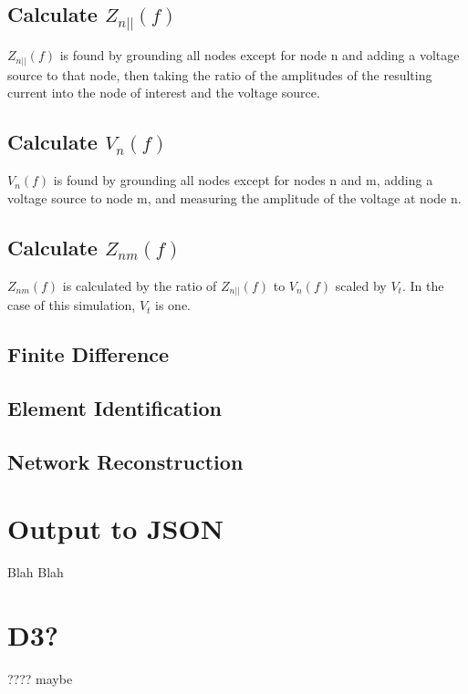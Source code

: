 \subsection{Calculate $Z_{n{||}}(f)$}
$Z_{n{||}}(f)$ is found by grounding all nodes except for node n and adding a voltage source to that node, then taking the ratio of the amplitudes of the resulting current into the node of interest and the voltage source.
\subsection{Calculate $V_n(f)$}
$V_n(f)$ is found by grounding all nodes except for nodes n and m, adding a voltage source to node m, and measuring the amplitude of the voltage at node n.
\subsection{Calculate $Z_{nm}(f)$}
$Z_{nm}(f)$ is calculated by the ratio of $Z_{n{||}}(f)$ to $V_n(f)$ scaled by $V_t$.
In the case of this simulation, $V_t$ is one.
\subsection{Finite Difference}

\subsection{Element Identification}

\subsection{Network Reconstruction}

\section{Output to JSON}
Blah Blah

\section{D3?}
???? maybe

%
